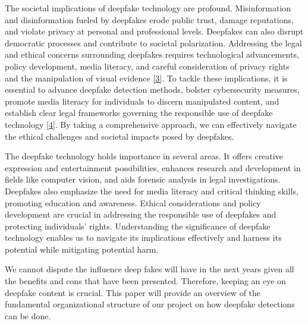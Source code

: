 \noindent The societal implications of deepfake technology are profound. Misinformation and disinformation fueled by deepfakes erode public trust, damage reputations, and violate privacy at personal and professional levels. Deepfakes can also disrupt democratic processes and contribute to societal polarization. Addressing the legal and ethical concerns surrounding deepfakes requires technological advancements, policy development, media literacy, and careful consideration of privacy rights and the manipulation of visual evidence \hyperref[ref3]{[3]}.
To tackle these implications, it is essential to advance deepfake detection methods, bolster cybersecurity measures, promote media literacy for individuals to discern manipulated content, and establish clear legal frameworks governing the responsible use of deepfake technology \hyperref[ref4]{[4]}. By taking a comprehensive approach, we can effectively navigate the ethical challenges and societal impacts posed by deepfakes.

\noindent The deepfake technology holds importance in several areas. It offers creative expression and entertainment possibilities, enhances research and development in fields like computer vision, and aids forensic analysis in legal investigations. Deepfakes also emphasize the need for media literacy and critical thinking skills, promoting education and awareness. Ethical considerations and policy development are crucial in addressing the responsible use of deepfakes and protecting individuals' rights. Understanding the significance of deepfake technology enables us to navigate its implications effectively and harness its potential while mitigating potential harm.

\noindent We cannot dispute the influence deep fakes will have in the next years given all the benefits and cons that have been presented. Therefore, keeping an eye on deepfake content is crucial. This paper will provide an overview of the fundamental organizational structure of our project on how deepfake detections can be done.
